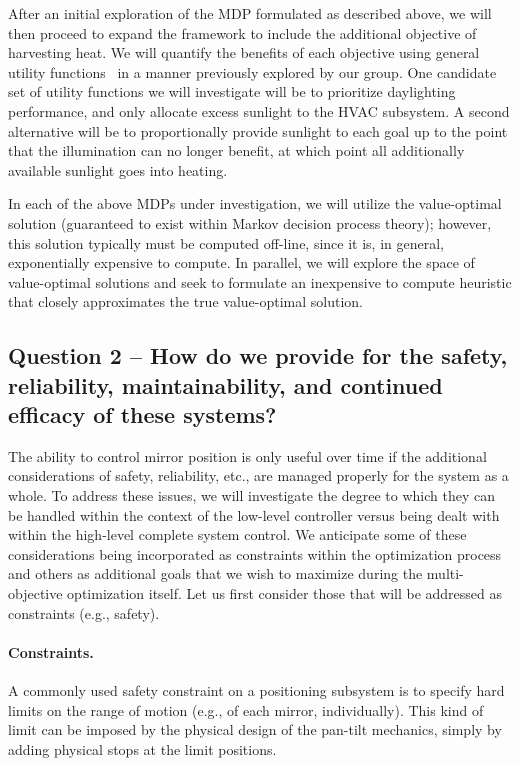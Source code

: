 After an initial exploration of the MDP formulated as described above,
we will then proceed to expand the framework to include the additional
objective of harvesting heat.  We will quantify the benefits of each
objective using general utility functions~\cite{tggs10} in a manner previously
explored by our group. One candidate set of utility functions we will
investigate will be to prioritize daylighting performance, and only
allocate excess sunlight to the HVAC subsystem. A second alternative
will be to proportionally provide sunlight to each goal up to the point
that the illumination can no longer benefit, at which point all additionally
available sunlight goes into heating.

In each of the above MDPs under investigation, we will utilize the
value-optimal solution (guaranteed to exist within Markov decision process
theory); however, this solution typically must be computed off-line, since
it is, in general, exponentially expensive to compute.  In parallel, we
will explore the space of value-optimal solutions and seek to formulate
an inexpensive to compute heuristic that closely approximates the
true value-optimal solution.

\subsection{Question 2 -- How do we provide for the safety, reliability,
maintainability, and continued efficacy of these systems?}

The ability to control mirror position is only useful over time if the
additional considerations of safety, reliability, etc., are managed
properly for the system as a whole. To address these issues, we will
investigate the degree to which they can be handled within the context
of the low-level controller versus being dealt with within the
high-level complete system control. We anticipate some of these
considerations being incorporated as constraints within the
optimization process and others as additional goals that we wish to
maximize during the multi-objective optimization itself.  Let us first
consider those that will be addressed as constraints (e.g., safety).

\paragraph{Constraints.}
A commonly used safety constraint on a positioning subsystem is to
specify hard limits on the range of motion (e.g., of each mirror, individually).
This kind of limit can be imposed by the physical design of the pan-tilt
mechanics, simply by adding physical stops at the limit positions.

